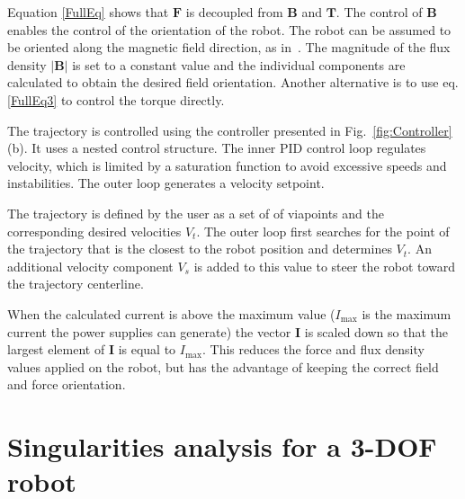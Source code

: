Equation \ref{FullEq} shows that $\mathbf{F}$ is decoupled from $\mathbf{B}$ and $\mathbf{T}$. The control of $\mathbf{B}$ enables the control of the orientation of the robot. The robot can be assumed to be oriented along the magnetic field direction, as in~\cite{kummer2010octomag}. The magnitude of the flux density $|\mathbf{B}|$ is set to a constant value and the individual components are calculated to obtain the desired field orientation. Another alternative is to use eq. \ref{FullEq3} to control the torque directly.

The trajectory is controlled using the controller presented in Fig.~\ref{fig:Controller}(b). It uses a nested control structure. 
The inner PID control loop regulates velocity, which is limited by a saturation function to avoid excessive speeds and instabilities. 
The outer loop generates a velocity setpoint.\par

The trajectory is defined by the user as a set of of viapoints and the corresponding desired velocities $V_t$. The outer loop first searches for the point of the trajectory that is the closest to the robot position and determines $V_t$. An additional velocity component $V_s$ is added to this value to steer the robot toward the trajectory centerline.\par
  
When the calculated current is above the maximum value ($I_{\textrm{max}}$ is the maximum current the power supplies can generate) the vector $\mathbf{I}$ is scaled down so that the largest element of $\mathbf{I}$ is equal to $I_{\textrm{max}}$. 
This reduces the force and flux density values applied on the robot, but has the advantage of keeping the correct field and force orientation. 



\section{Singularities analysis for a 3-DOF robot} \label{sec:singularities}

